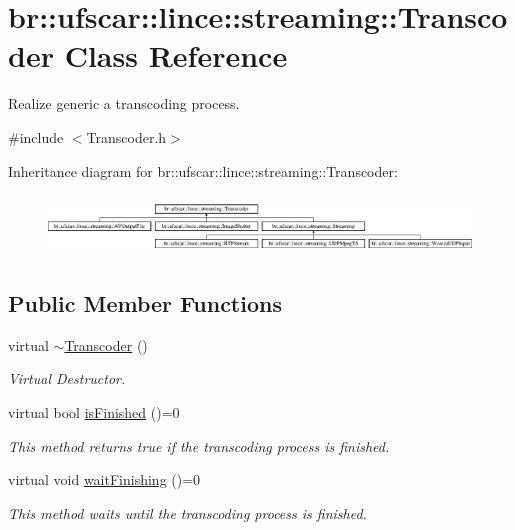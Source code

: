 \hypertarget{classbr_1_1ufscar_1_1lince_1_1streaming_1_1Transcoder}{
\section{br::ufscar::lince::streaming::Transcoder Class Reference}
\label{classbr_1_1ufscar_1_1lince_1_1streaming_1_1Transcoder}
}


Realize generic a transcoding process.  




{\ttfamily \#include $<$Transcoder.h$>$}

Inheritance diagram for br::ufscar::lince::streaming::Transcoder:\begin{figure}[H]
\begin{center}
\leavevmode
\includegraphics[height=1.58491cm]{classbr_1_1ufscar_1_1lince_1_1streaming_1_1Transcoder}
\end{center}
\end{figure}
\subsection*{Public Member Functions}
\begin{DoxyCompactItemize}
\item 
virtual \hyperlink{classbr_1_1ufscar_1_1lince_1_1streaming_1_1Transcoder_a4139c5f7d098ae0a2b9e2e4d314ab991}{$\sim$Transcoder} ()
\begin{DoxyCompactList}\small\item\em Virtual Destructor. \item\end{DoxyCompactList}\item 
virtual bool \hyperlink{classbr_1_1ufscar_1_1lince_1_1streaming_1_1Transcoder_a6d2588da9583e98496882efa9b472ec4}{isFinished} ()=0
\begin{DoxyCompactList}\small\item\em This method returns true if the transcoding process is finished. \item\end{DoxyCompactList}\item 
virtual void \hyperlink{classbr_1_1ufscar_1_1lince_1_1streaming_1_1Transcoder_abec1e8b2d9e04e79bf878206a70df2d9}{waitFinishing} ()=0
\begin{DoxyCompactList}\small\item\em This method waits until the transcoding process is finished. \item\end{DoxyCompactList}\end{DoxyCompactItemize}
